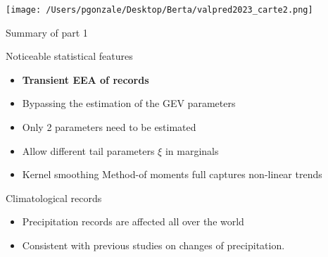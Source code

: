 \documentclass[9pt,compress]{beamer}
\begin{document}
%
%
%
\begin{frame}%
\begin{center}
\texttt{[image: /Users/pgonzale/Desktop/Berta/valpred2023\_carte2.png]}
\end{center}    
\end{frame}
%
%
%
\begin{frame}{Summary of part 1}
\begin{block}{Noticeable statistical  features}
 \begin{itemize}
	\item {\bf Transient EEA of records}
	\item Bypassing the estimation of the GEV parameters
	\item Only 2 parameters need to be estimated
	\item Allow different tail parameters $\xi$ in marginals
	\item Kernel smoothing Method-of moments full captures non-linear trends
\end{itemize}
\end{block} 
\vfill
\begin{block}{Climatological  records}
 \begin{itemize}
	\item  Precipitation records are affected all over the world
	\item  Consistent with previous studies on changes of precipitation.
\end{itemize}
\end{block} 

\end{frame}

%
%
%
\end{document}
